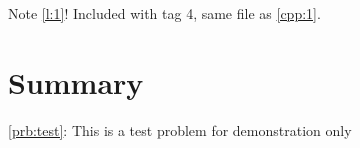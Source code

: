 \documentclass[12pt]{report}
\begin{document}
Note \cref{l:1}! Included with tag 4, same file as \cref{cpp:1}.


\chapter{Summary}

\cref{prb:test}: This is a test problem for demonstration only


 

\end{document}
